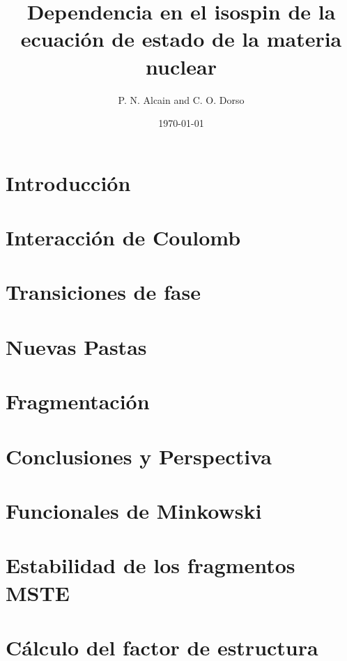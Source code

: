 \documentclass[12pt]{book}
\title{Dependencia en el isospin de la ecuación de estado de la materia nuclear}
\author{P. N. Alcain and C. O. Dorso}
\date{\today}
\begin{document}
\maketitle
{}
\tableofcontents

\chapter[Introducción]{Introducción}
\label{ch:introduccion}



\chapter[Efecto de Coulomb]{Interacción de Coulomb}
\label{ch:coulomb}


\chapter[Transiciones de fase]{Transiciones de fase}
\label{ch:transicion}


\chapter[Nuevas pastas]{Nuevas Pastas}
\label{ch:nuevas_pastas}


\chapter[Fragmentación]{Fragmentación}
\label{ch:fragmentacion}


\chapter[Conclusiones y Perspectiva]{Conclusiones y Perspectiva}
\label{ch:conclusiones}


\appendix
\chapter{Funcionales de Minkowski}
\label{ap:minkowski}


\chapter{Estabilidad de los fragmentos MSTE}
\label{ap:mste}


\chapter{Cálculo del factor de estructura}
\label{ap:sq}



\end{document}
